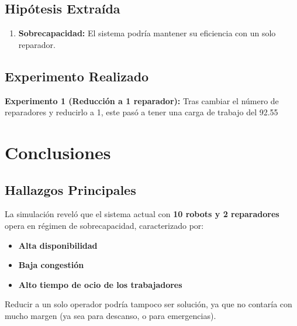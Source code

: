 \documentclass[12pt, a4paper]{article}
\begin{document}
\subsection{Hipótesis Extraída}
\begin{enumerate}
    \item \textbf{Sobrecapacidad:} El sistema podría mantener su eficiencia con un solo reparador.
\end{enumerate}

\subsection{Experimento Realizado}

\textbf{Experimento 1 (Reducción a 1 reparador):}
Tras cambiar el número de reparadores y reducirlo a 1, este pasó a tener una carga de trabajo del 92.55%


\section{Conclusiones}
\label{sec:conclusiones}

\subsection{Hallazgos Principales}
La simulación reveló que el sistema actual con \textbf{10 robots y 2 reparadores} opera en régimen de sobrecapacidad, caracterizado por:
\begin{itemize}
    \item \textbf{Alta disponibilidad}
    \item \textbf{Baja congestión}
    \item \textbf{Alto tiempo de ocio de los trabajadores}
\end{itemize}

    Reducir a un solo operador podría tampoco ser solución, ya que no contaría con mucho margen (ya sea para descanso, o para emergencias).

\begin{center}
\end{center}
\end{document}
